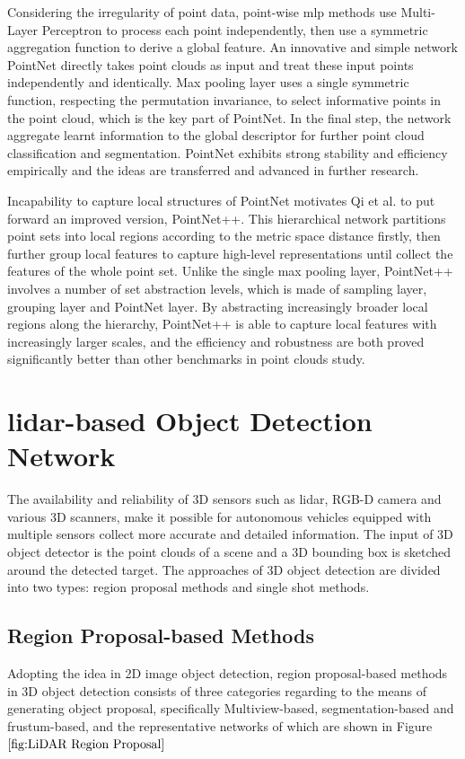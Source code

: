 Considering the irregularity of point data, point-wise \acrshort{mlp} methods use Multi-Layer Perceptron to process each point independently, then use a symmetric aggregation function to derive a global feature. An innovative and simple network PointNet\cite{qi_pointnet_2017} directly takes point clouds as input and treat these input points independently and identically. Max pooling layer uses a single symmetric function, respecting the permutation invariance, to select informative points in the point cloud, which is the key part of PointNet. In the final step, the network aggregate learnt information to the global descriptor for further point cloud classification and segmentation. PointNet exhibits strong stability and efficiency empirically and the ideas are transferred and advanced in further research.

Incapability to capture local structures of PointNet motivates Qi et al.\cite{qiPointNetDeepHierarchical2017} to put forward an improved version, PointNet++. This hierarchical network partitions point sets into local regions according to the metric space distance firstly, then further group local features to capture high-level representations until collect the features of the whole point set. Unlike the single max pooling layer, PointNet++ involves a number of set abstraction levels, which is made of sampling layer, grouping layer and PointNet layer. By abstracting increasingly broader local regions along the hierarchy, PointNet++ is able to capture local features with increasingly larger scales, and the efficiency and robustness are both proved significantly better than other benchmarks in point clouds study.

\section{\acrshort{lidar}-based Object Detection Network}
The availability and reliability of 3D sensors such as \acrshort{lidar}, RGB-D camera and various 3D scanners, make it possible for autonomous vehicles equipped with multiple sensors collect more accurate and detailed information. The input of 3D object detector is the point clouds of a scene and a 3D bounding box is sketched around the detected target. The approaches of 3D object detection are divided into two types: region proposal methods and single shot methods. 
\subsection{Region Proposal-based Methods}
Adopting the idea in 2D image object detection, region proposal-based methods in 3D object detection consists of three categories regarding to the means of generating object proposal, specifically Multiview-based, segmentation-based and frustum-based, and the representative networks of which are shown in Figure \(\ref{fig:LiDAR Region Proposal}\)
